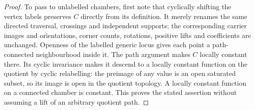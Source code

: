 \begin{proof}
To pass to unlabelled chambers, first note that cyclically shifting the
vertex labels preserves $C$ directly from its definition. It merely
renames the same directed traversal, crossings and independent supports;
the corresponding carrier images and orientations, corner counts,
rotations, positive lifts and coefficients are unchanged. Openness of the
labelled generic locus gives each point a path-connected neighbourhood
inside it. The path argument makes $C$ locally constant there. Its
cyclic invariance makes it descend to a locally constant function on the
quotient by cyclic relabelling: the preimage of any value is an open
saturated subset, so its image is open in the quotient topology. A
locally constant function on a connected chamber is constant. This proves
the stated assertion without assuming a lift of an arbitrary quotient path.
\end{proof}

